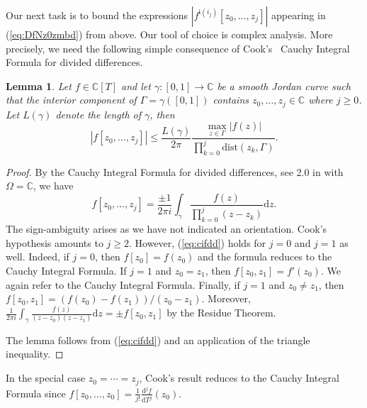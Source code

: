 \documentclass[12pt,oneside,a4]{amsart}
\newcommand{\IC}{\mathbb{C}}
\newcounter{maincounter}
\numberwithin{maincounter}{section}
\numberwithin{equation}{section}
\newtheorem{lemma}[maincounter]{Lemma}
\begin{document}
Our next task is to bound the expressions
$|f^{\mathfrak{i}(i_j)}[z_0,\ldots,z_j]|$ appearing in
(\ref{eq:DfNz0zmbd}) from above. Our tool of choice is  complex analysis.
More precisely, we need the following simple consequence of
Cook's~\cite{Cook:DD} Cauchy Integral Formula for
divided differences.

\begin{lemma}
  \label{lem:cifdd}
  Let $f\in\IC[T]$ and 
  let $\gamma \colon [0,1]\rightarrow \IC$ be a
  smooth Jordan curve such that the interior
  component of $\Gamma=\gamma([0,1])$ contains $z_0,\ldots,z_j \in
  \IC$ where $j\ge 0$.
  Let $L(\gamma)$ denote the length of $\gamma$, 
  then
  \begin{equation*}
    |f[z_0,\ldots,z_j]| \le \frac{L(\gamma)}{2\pi} \frac{\max_{z\in
        \Gamma} |f(z)|}{\prod_{k=0}^{j} \mathrm{dist}(z_k,\Gamma)}.
  \end{equation*}
\end{lemma}
\begin{proof}
  By the Cauchy Integral Formula for divided differences,
  see 2.0 in \cite{Cook:DD} with $\Omega=\IC$, we have
  \begin{equation}
    \label{eq:cifdd}
    f[z_0,\ldots,z_j] = \frac{\pm 1}{2\pi i} \int_\gamma
    \frac{f(z)}{\prod_{k=0}^{j} (z-z_k)} \mathrm{d}z. 
  \end{equation}
  The sign-ambiguity arises as we have not indicated an orientation.
  Cook's hypothesis amounts to $j\ge 2$. However, (\ref{eq:cifdd}) holds
  for $j=0$ and $j=1$ as well. 
  Indeed, if $j=0$, then $f[z_0] = f(z_0)$ and the formula reduces to
  the Cauchy Integral Formula.
  If $j=1$ and $z_0=z_1$, then $f[z_0,z_1] = f'(z_0)$. We again
  refer to the Cauchy Integral Formula. Finally, if $j=1$ and
  $z_0\not=z_1$, then $f[z_0,z_1] = (f(z_0)-f(z_1))/(z_0-z_1)$.
  Moreover,
  $\frac{1}{2\pi i}\int_\gamma \frac{f(z)}{(z-z_0)(z-z_1)} \mathrm{d}z =
  \pm f[z_0,z_1]$ by the Residue Theorem.
  
  The lemma follows from (\ref{eq:cifdd}) and an application of
  the triangle inequality.
\end{proof}

In the special case $z_0=\cdots=z_j$, Cook's result reduces to the
Cauchy Integral Formula since
$f[z_0,\ldots,z_0]= \frac{1}{j!} \frac{\mathrm{d}^j
  f}{\mathrm{d}T^j}(z_0)$.
\end{document}
